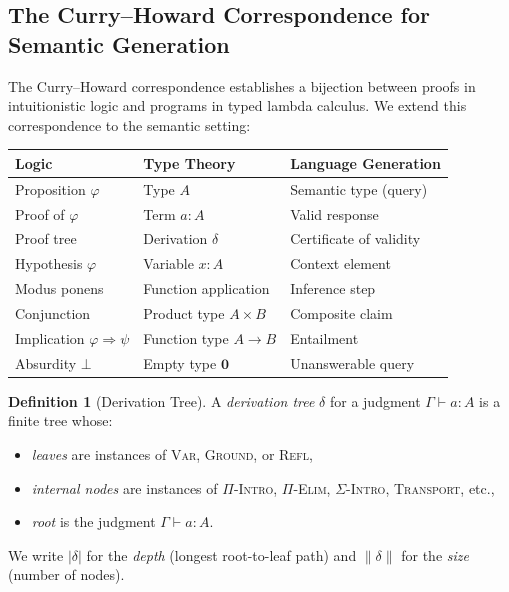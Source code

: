 \documentclass[11pt,a4paper]{article}
\theoremstyle{plain}
\theoremstyle{definition}
\newtheorem{definition}[theorem]{Definition}
\theoremstyle{remark}
\begin{document}
\subsection{The Curry--Howard Correspondence for Semantic Generation}

The Curry--Howard correspondence \cite{howard1980} establishes a bijection between proofs in intuitionistic logic and programs in typed lambda calculus.
We extend this correspondence to the semantic setting:

\begin{center}
\begin{tabular}{lll}
\toprule
\textbf{Logic} & \textbf{Type Theory} & \textbf{Language Generation} \\
\midrule
Proposition $\varphi$ & Type $A$ & Semantic type (query) \\
Proof of $\varphi$ & Term $a : A$ & Valid response \\
Proof tree & Derivation $\delta$ & Certificate of validity \\
Hypothesis $\varphi$ & Variable $x : A$ & Context element \\
Modus ponens & Function application & Inference step \\
Conjunction & Product type $A \times B$ & Composite claim \\
Implication $\varphi \Rightarrow \psi$ & Function type $A \to B$ & Entailment \\
Absurdity $\bot$ & Empty type $\mathbf{0}$ & Unanswerable query \\
\bottomrule
\end{tabular}
\end{center}

\begin{definition}[Derivation Tree]\label{def:derivation}
A \emph{derivation tree} $\delta$ for a judgment $\Gamma \vdash a : A$ is a finite tree whose:
\begin{itemize}[nosep]
  \item \emph{leaves} are instances of \textsc{Var}, \textsc{Ground}, or \textsc{Refl},
  \item \emph{internal nodes} are instances of \textsc{$\Pi$-Intro}, \textsc{$\Pi$-Elim}, \textsc{$\Sigma$-Intro}, \textsc{Transport}, etc.,
  \item \emph{root} is the judgment $\Gamma \vdash a : A$.
\end{itemize}
We write $|\delta|$ for the \emph{depth} (longest root-to-leaf path) and $\|\delta\|$ for the \emph{size} (number of nodes).
\end{definition}
\end{document}
